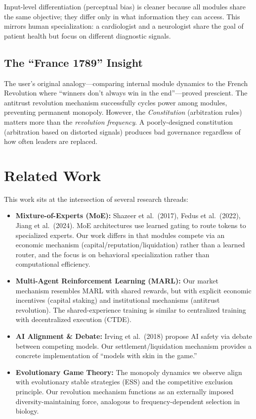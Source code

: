 \documentclass[a4paper,11pt]{article}
\begin{document}
Input-level differentiation (perceptual bias) is cleaner because all modules share the same objective; they differ only in what information they can access. This mirrors human specialization: a cardiologist and a neurologist share the goal of patient health but focus on different diagnostic signals.

\subsection{The ``France 1789'' Insight}

The user's original analogy---comparing internal module dynamics to the French Revolution where ``winners don't always win in the end''---proved prescient. The antitrust revolution mechanism successfully cycles power among modules, preventing permanent monopoly. However, the \textit{Constitution} (arbitration rules) matters more than the \textit{revolution frequency}. A poorly-designed constitution (arbitration based on distorted signals) produces bad governance regardless of how often leaders are replaced.

\section{Related Work}

This work sits at the intersection of several research threads:

\begin{itemize}[itemsep=2pt]
    \item \textbf{Mixture-of-Experts (MoE):} Shazeer et al.\ (2017), Fedus et al.\ (2022), Jiang et al.\ (2024). MoE architectures use learned gating to route tokens to specialized experts. Our work differs in that modules compete via an economic mechanism (capital/reputation/liquidation) rather than a learned router, and the focus is on behavioral specialization rather than computational efficiency.
    \item \textbf{Multi-Agent Reinforcement Learning (MARL):} Our market mechanism resembles MARL with shared rewards, but with explicit economic incentives (capital staking) and institutional mechanisms (antitrust revolution). The shared-experience training is similar to centralized training with decentralized execution (CTDE).
    \item \textbf{AI Alignment \& Debate:} Irving et al.\ (2018) propose AI safety via debate between competing models. Our settlement/liquidation mechanism provides a concrete implementation of ``models with skin in the game.''
    \item \textbf{Evolutionary Game Theory:} The monopoly dynamics we observe align with evolutionary stable strategies (ESS) and the competitive exclusion principle. Our revolution mechanism functions as an externally imposed diversity-maintaining force, analogous to frequency-dependent selection in biology.
\end{itemize}
\end{document}
